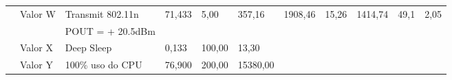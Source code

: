\begin{table}[htp]
\begin{tabular}{lllllllllll}
\rowcolor[HTML]{C0C0C0} 
\multicolumn{1}{|c|}{\multirow{-3}{*}{\cellcolor[HTML]{C0C0C0}1}} & \multicolumn{1}{l|}{\cellcolor[HTML]{C0C0C0}Valor W} & \multicolumn{1}{l|}{\cellcolor[HTML]{C0C0C0}Transmit 802.11n} & \multicolumn{1}{l|}{\cellcolor[HTML]{C0C0C0}71,433} & \multicolumn{1}{l|}{\cellcolor[HTML]{C0C0C0}5,00}   & \multicolumn{1}{l|}{\cellcolor[HTML]{C0C0C0}357,16}  & \multicolumn{1}{l|}{\multirow{-3}{*}{\cellcolor[HTML]{C0C0C0}1908,46}} & \multicolumn{1}{l|}{\multirow{-3}{*}{\cellcolor[HTML]{C0C0C0}15,26}} & \multicolumn{1}{l|}{\multirow{-3}{*}{\cellcolor[HTML]{C0C0C0}1414,74}} & \multicolumn{1}{l|}{\multirow{-3}{*}{\cellcolor[HTML]{C0C0C0}49,1}} & \multicolumn{1}{l|}{\multirow{-3}{*}{\cellcolor[HTML]{C0C0C0}2,05}} \\
\rowcolor[HTML]{C0C0C0} 
\multicolumn{1}{|l|}{\cellcolor[HTML]{C0C0C0}}                    & \multicolumn{1}{l|}{\cellcolor[HTML]{C0C0C0}}        & \multicolumn{1}{l|}{\cellcolor[HTML]{C0C0C0}POUT = + 20.5dBm} & \multicolumn{1}{l|}{\cellcolor[HTML]{C0C0C0}}       & \multicolumn{1}{l|}{\cellcolor[HTML]{C0C0C0}}       & \multicolumn{1}{l|}{\cellcolor[HTML]{C0C0C0}}        & \multicolumn{1}{l|}{\cellcolor[HTML]{C0C0C0}}                          & \multicolumn{1}{l|}{\cellcolor[HTML]{C0C0C0}}                        & \multicolumn{1}{l|}{\cellcolor[HTML]{C0C0C0}}                          & \multicolumn{1}{l|}{\cellcolor[HTML]{C0C0C0}}                       & \multicolumn{1}{l|}{\cellcolor[HTML]{C0C0C0}}                       \\ \hline
\multicolumn{1}{|c|}{}                                            & \multicolumn{1}{l|}{Valor X}                         & \multicolumn{1}{l|}{Deep Sleep}                               & \multicolumn{1}{l|}{0,133}                          & \multicolumn{1}{l|}{100,00}                         & \multicolumn{1}{l|}{13,30}                           & \multicolumn{1}{l|}{}                                                  & \multicolumn{1}{l|}{}                                                & \multicolumn{1}{l|}{}                                                  & \multicolumn{1}{l|}{}                                               & \multicolumn{1}{l|}{}                                               \\ \cline{2-6}
\multicolumn{1}{|c|}{}                                            & \multicolumn{1}{l|}{Valor Y}                         & \multicolumn{1}{l|}{100\% uso do CPU}                         & \multicolumn{1}{l|}{76,900}                         & \multicolumn{1}{l|}{200,00}                         & \multicolumn{1}{l|}{15380,00}                        & \multicolumn{1}{l|}{}                                                  & \multicolumn{1}{l|}{}                                                & \multicolumn{1}{l|}{}                                                  & \multicolumn{1}{l|}{}                                               & \multicolumn{1}{l|}{}                                               \\ \cline{2-6}

\end{tabular}
\end{table}
